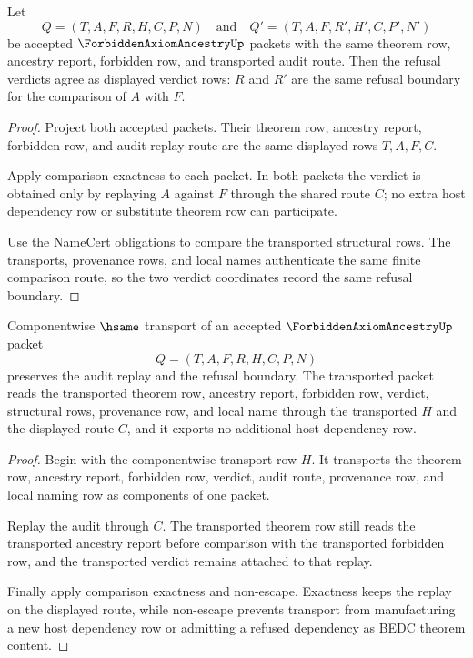 \begin{theorem}
\label{thm:forbidden-axiom-ancestry-refusal-determinacy}
Let
$$
Q=(T,A,F,R,H,C,P,N)
\quad\text{and}\quad
Q'=(T,A,F,R',H',C,P',N')
$$
be accepted $\ForbiddenAxiomAncestryUp$ packets with the same theorem row, ancestry report, forbidden row, and transported audit route. Then the refusal verdicts agree as displayed verdict rows: $R$ and $R'$ are the same refusal boundary for the comparison of $A$ with $F$.
\end{theorem}
\begin{proof}
Project both accepted packets. Their theorem row, ancestry report, forbidden row, and audit replay route are the same displayed rows $T,A,F,C$.

Apply comparison exactness to each packet. In both packets the verdict is obtained only by replaying $A$ against $F$ through the shared route $C$; no extra host dependency row or substitute theorem row can participate.

Use the NameCert obligations to compare the transported structural rows. The transports, provenance rows, and local names authenticate the same finite comparison route, so the two verdict coordinates record the same refusal boundary.
\end{proof}

\begin{theorem}
\label{thm:forbidden-axiom-ancestry-transport-replay}
Componentwise $\hsame$ transport of an accepted $\ForbiddenAxiomAncestryUp$ packet
$$
Q=(T,A,F,R,H,C,P,N)
$$
preserves the audit replay and the refusal boundary. The transported packet reads the transported theorem row, ancestry report, forbidden row, verdict, structural rows, provenance row, and local name through the transported $H$ and the displayed route $C$, and it exports no additional host dependency row.
\end{theorem}
\begin{proof}
Begin with the componentwise transport row $H$. It transports the theorem row, ancestry report, forbidden row, verdict, audit route, provenance row, and local naming row as components of one packet.

Replay the audit through $C$. The transported theorem row still reads the transported ancestry report before comparison with the transported forbidden row, and the transported verdict remains attached to that replay.

Finally apply comparison exactness and non-escape. Exactness keeps the replay on the displayed route, while non-escape prevents transport from manufacturing a new host dependency row or admitting a refused dependency as BEDC theorem content.
\end{proof}


